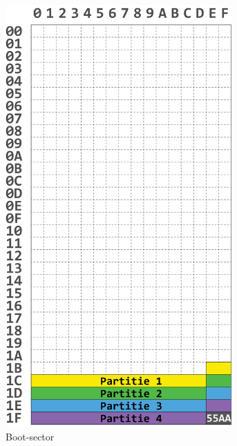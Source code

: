 \begin{figure}[h!]
    \begin{subfigure}[t]{0.3\textwidth}
        \centering
        \includegraphics[width=0.95\textwidth]{img/boot-sector.png}
        \caption{Boot-sector}
        \label{fig:boot-sector}
    \end{subfigure}%
    ~ 
    \begin{subfigure}[t]{0.7\textwidth}
        \centering

\end{subfigure}
\end{figure}
